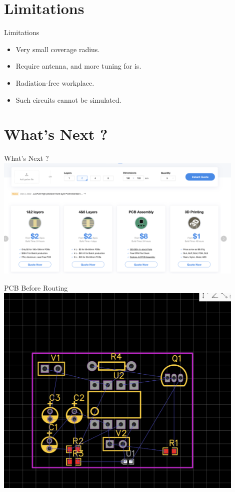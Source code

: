 \documentclass{loyola-beamer}
\begin{document}
\section{Limitations}

\begin{frame}{Limitations}
	\begin{itemize}
		\item Very small coverage radius.
		\item Require antenna, and more tuning for is.
		\item Radiation-free workplace.
		\item Such circuits cannot be simulated.
	\end{itemize}
\end{frame}

\section{What's Next ?}

\begin{frame}{What's Next ?}
	\includegraphics[width=0.9\textwidth]{../PCB-printer.png}
\end{frame}

\begin{frame}{PCB Before Routing}
	\includegraphics[width=0.9\textwidth]{../PCB-before.png}
\end{frame}
\end{document}
